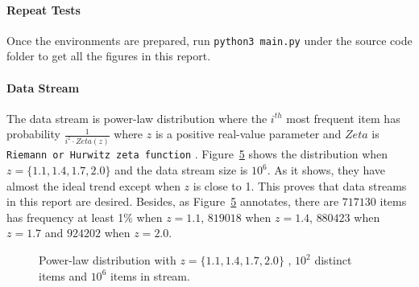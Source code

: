 \documentclass[10pt]{article}
\begin{document}
\paragraph{Repeat Tests}
Once the environments are prepared, run \texttt{python3 main.py} under the source code folder to get all the figures in this report.

\paragraph{Data Stream}
The data stream is power-law distribution where 
the $i^{th}$ most frequent item has probability $\frac{1}{i^{z} \cdot{} Zeta(z)}$
where $z$ is a positive real-value parameter and $Zeta$ is \texttt{Riemann or Hurwitz zeta function} \cite{zeta}. 
Figure~\ref{powerlaw} shows the distribution when $z = \{1.1, 1.4, 1.7, 2.0\}$ and the data stream size is $10^6$.
As it shows, they have almost the ideal trend except when $z$ is close to 1. 
This proves that data streams in this report are desired.
Besides, as Figure~\ref{powerlaw} annotates, there are $717130$ items has frequency at least 1\% when $z=1.1$,  
$819018$ when  $z=1.4$, $880423$ when $z=1.7$ and $924202$ when $z=2.0$.


\begin{figure}[H]
     \begin{subfigure}[b]{0.5\textwidth}
          \centering
          \label{power-law-z-1.1-100-stream-1000000}
    \end{subfigure}
    \begin{subfigure}[b]{0.5\textwidth}
          \centering
          \label{power-law-z-1.4-100-stream-1000000}
    \end{subfigure}
    \begin{subfigure}[b]{0.5\textwidth}
          \centering
          \label{power-law-z-1.7-100-stream-1000000}
    \end{subfigure}
    \begin{subfigure}[b]{0.5\textwidth}
          \centering
          \label{power-law-z-2.0-100-stream-1000000}
    \end{subfigure}
 
    \caption{Power-law distribution with $z = \{1.1, 1.4, 1.7, 2.0\}$ , $10^2$ distinct items and $10^6$ items in stream.}
    \label{powerlaw}
\end{figure}
\end{document}
